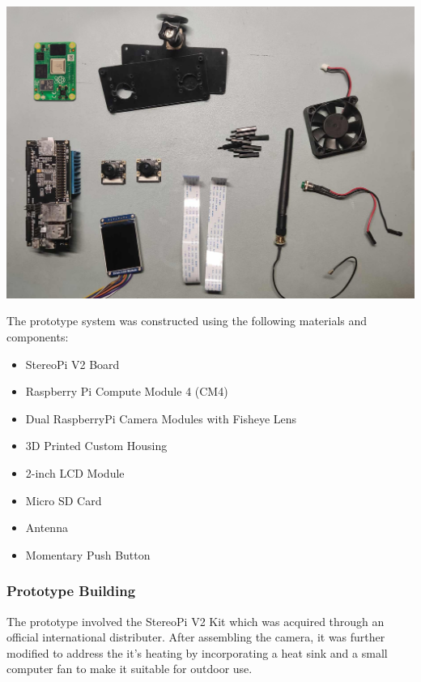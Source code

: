 \begin{center}
	\includegraphics[width=\textwidth]{Parts.png}
\end{center}

The prototype system was constructed using the following materials and components:
\begin{itemize}
	\item StereoPi V2 Board
	\item Raspberry Pi Compute Module 4 (CM4)
	\item Dual RaspberryPi Camera Modules with Fisheye Lens
	\item 3D Printed Custom Housing
	\item 2-inch LCD Module
	\item Micro SD Card
	\item Antenna
	\item Momentary Push Button
\end{itemize}



\subsubsection{Prototype Building}
The prototype involved the StereoPi V2 Kit which was acquired through an official international distributer. After assembling the camera, it was further modified to address the it's heating by incorporating a heat sink and a small computer fan to make it suitable for outdoor use.


